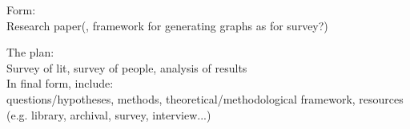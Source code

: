 \documentclass[12pt]{article}
\begin{document}
Form:\\
Research paper(, framework for generating graphs as for survey?)

The plan:\\
Survey of lit, survey of people, analysis of results\\


In final form, include:\\
questions/hypotheses, methods, theoretical/methodological framework, resources (e.g. library, archival, survey, interview...)


\begin{comment}
The Honors College recommends a ``syllabus" with the proposal

\section{Syllabus}
\subsection{Aspirational learning outcomes}
Gain skills in:
\begin{enumerate}
	\item Research methods/processes
	\item Reading papers
	\item Designing/carrying out a survey
	\item Compiling results into a paper
	\item Steps involved in publishing a paper
\end{enumerate}
\subsection{Expected work}
Phase 1
\begin{enumerate}
	\item Survey of gestalt/graph vis papers (Scan papers, decide most relevant, read those more in depth, discuss with Stephen and compare)
	\item Compile what's there/what's relevant
\end{enumerate}
Phase 2
\begin{enumerate}
	\item Use that to update Stephen's hypotheses/survey goals
	\item Program visualizations, etc, to spread over factors want to test
	\item Design survey to gather that info
\end{enumerate}
Phase 3
\begin{enumerate}
	\item Conduct pre-survey as test run and make any necessary modifications (make sure likely to collect the data we're looking for)
	\item Run full survey
\end{enumerate}
Phase 4
\begin{enumerate}
	\item Analyze data (correlations, confoundings, etc)
	\item Come to conclusions (yes/no to Hs?)
	\item Write up paper/make pretty figures
\end{enumerate}

\end{comment}
\end{document}
